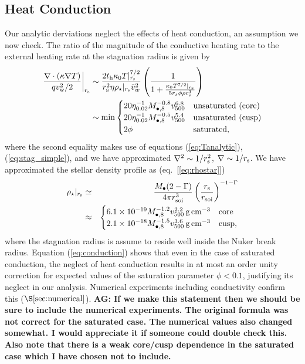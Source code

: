 \documentclass[usenatbib,fleqn]{mn2e}
\newcommand{\rs}{r_s}
\begin{document}
\subsection{Heat Conduction}
\label{sec:conductivity}

Our analytic derviations neglect the effects of heat conduction, an assumption we now check.  The ratio of the magnitude of the conductive heating rate to the external heating rate at the stagnation radius is given by
\begin{align}
  \left.\frac{\nabla\cdot(\kappa \nabla T)}{q v_{\rm
w}^{2}/2}\right|_{r_{\rm s}} &\sim \frac{2t_{\rm h}\kappa_0
T|_{r_{\rm s}}^{7/2}}{r_{\rm s}^{2}\eta \rho_{\star}|_{r_{\rm s}}
\tilde{v}_{w}^{2}}
 \left(\frac{1}{1+\frac{\kappa_0 T^{7/2}|_{r_{\rm s}}}{5 \rs
    \phi \rho c_s^3}}\right)
\nonumber \\ &\sim {\rm min}
  \begin{cases}
  20 \eta_{0.02}^{-1}
M_{\bullet,8}^{-0.8} v_{500}^{6.8} &  \text{unsaturated (core)}\\
 20 \eta_{0.02}^{-1}
M_{\bullet,8}^{-0.5} v_{500}^{5.4} &  \text{unsaturated (cusp)}\\
  2 \phi & \text{saturated},
  \end{cases}
 \label{eq:conduction}
\end{align}
where the second equality makes use of equations (\ref{eq:Tanalytic}),
(\ref{eq:stag_simple}), and we have approximated $\nabla^{2} \sim
1/r_{\rm s}^{2}$, $\nabla \sim 1/r_{\rm s}$.  We have approximated the
stellar density profile as (eq.~[\ref{eq:rhostar}])
\begin{eqnarray}
  \rho_{\star}|_{r_{\rm s}} &\simeq& \frac{M_{\bullet}(2-\Gamma)}{4\pi r_{\rm soi}^{3}}\left(\frac{r_{\rm s}}{r_{\rm soi}}\right)^{-1-\Gamma} \nonumber \\
 &\approx& \begin{cases}
    6.1 \times 10^{-19}M_{\bullet,8}^{-1.2}v_{500}^{2.2}\,{\rm g\,cm^{-3}}
    & \text{core} \\
    2.1 \times 10^{-18} M_{\bullet,8}^{-1.5}v_{500}^{3.6}
    \,{\rm g\,cm^{-3}}  & \text{cusp}, 
  \end{cases}
  \label{eq:rhostarrs}
\end{eqnarray}
where the stagnation radius is assume to reside well inside the Nuker
break radius.  Equation (\ref{eq:conduction}) shows that even in the
case of saturated conduction, the neglect of heat conduction results
in at most an order unity correction for expected values of the
saturation parameter $\phi < 0.1$, justifying its neglect in our
analysis.  Numerical experiments including conductivity confirm this
($\S\ref{sec:numerical}$). {\bf AG: If we make this statement then we
  should be sure to include the numerical experiments. The original
  formula was not correct for the saturated case. The numerical values
also changed somewhat. I would appreciate it if someone could double
check this. Also note that there is a weak core/cusp dependence in the
saturated case which I have chosen not to include.}
\end{document}
